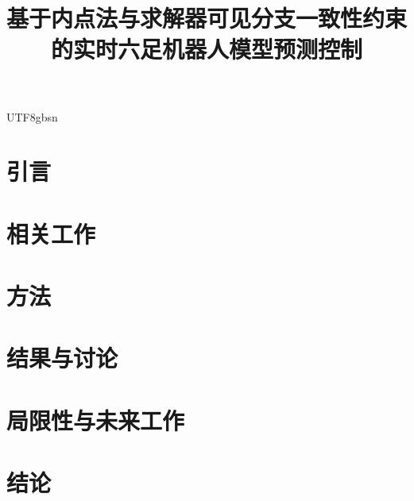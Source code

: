 \documentclass[conference]{IEEEtran}
\title{基于内点法与求解器可见分支一致性约束的实时六足机器人模型预测控制}
\author{
    \IEEEauthorblockN{匿名作者}
    \IEEEauthorblockA{匿名单位\\
    Email: anonymous@anonymous.edu}
}
\begin{document}
\begin{CJK*}{UTF8}{gbsn}

\maketitle

\begin{abstract}

\end{abstract}

\section{引言}


\section{相关工作}


\section{方法}


\section{结果与讨论}


\section{局限性与未来工作}


\section{结论}





\end{CJK*}
\end{document}
